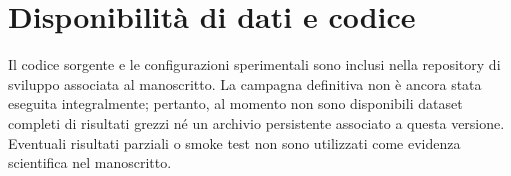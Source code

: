 \documentclass[10pt,a4paper,twocolumn]{article}
\begin{document}
\section*{Disponibilità di dati e codice}
Il codice sorgente e le configurazioni sperimentali sono inclusi nella repository di sviluppo associata al manoscritto. La campagna definitiva non è ancora stata eseguita integralmente; pertanto, al momento non sono disponibili dataset completi di risultati grezzi né un archivio persistente associato a questa versione. Eventuali risultati parziali o smoke test non sono utilizzati come evidenza scientifica nel manoscritto.





\clearpage
\onecolumn
\appendix
\renewcommand{\thefigure}{\thesection.\arabic{figure}}
\renewcommand{\thetable}{\thesection.\arabic{table}}
\renewcommand{\theequation}{\thesection.\arabic{equation}}
\renewcommand{\theHfigure}{app.\thesection.\arabic{figure}}
\renewcommand{\theHtable}{app.\thesection.\arabic{table}}
\renewcommand{\theHequation}{app.\thesection.\arabic{equation}}
\end{document}
